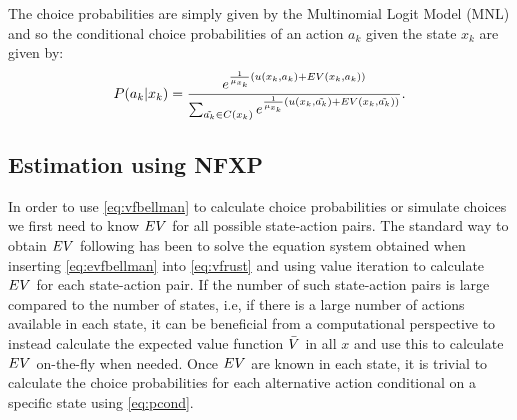 The choice probabilities are simply given by the Multinomial Logit Model (MNL) and so the conditional choice probabilities of an action $a_k$ given the state $x_k$ are given by:
\newcommand{\akt}{\tilde{a_k}}
\begin{equation} \label{eq:pcond}
P(a_k|x_k) = \frac{e^{\frac{1}{\mu_{x_k}}\left(\avgu(x_k,a_k) + \eutil(x_k,a_k)\right)}}{\sum_{\akt \in C(x_k)}e^{\frac{1}{\mu_{x_k}}\left(\avgu(x_k,\akt) + \eutil(x_k,\akt)\right)}}.
\end{equation}




\subsection{Estimation using NFXP}
In order to use \eqref{eq:vfbellman} to calculate choice probabilities or simulate choices we first need to know $EV$ for all possible state-action pairs.  
The standard way to obtain $EV$ following \citet{Rust87} has been to solve the equation system obtained when inserting \eqref{eq:evfbellman} into \eqref{eq:vfrust} and using value iteration to calculate $EV$ for each state-action pair.   
If the number of such state-action pairs is large compared to the number of states, i.e, if there is a large number of actions available in each state, it can be beneficial from a computational perspective to instead calculate the expected value function $\bar{V}$ in all $x$ and use this to calculate $EV$ on-the-fly when needed. Once $EV$ are known in each state, it is trivial to calculate the choice probabilities for each alternative action conditional on a specific state using \eqref{eq:pcond}.
